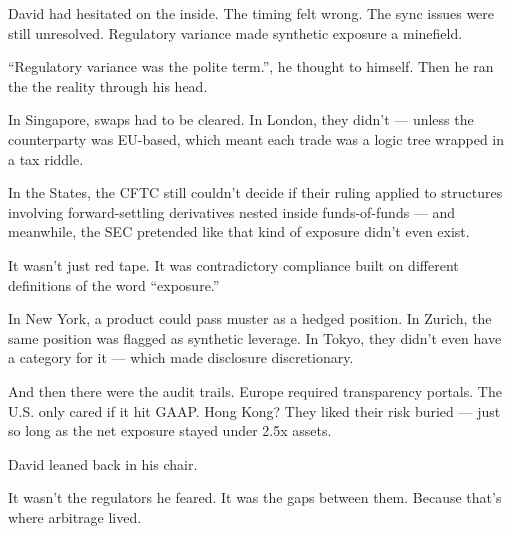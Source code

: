 David had hesitated on the inside.
The timing felt wrong. The sync issues were still unresolved. Regulatory variance made synthetic exposure 
a minefield.

``Regulatory variance was the polite term.'', he thought to himself. Then he ran the
the reality through his head.

\medskip

\begin{tcolorbox}[
    enhanced,
    sharp corners,
    boxrule=0pt,
    colback=gray!3,
    borderline west={2pt}{0pt}{gray!60}, %
    left=10pt,
    right=10pt,
    top=6pt,
    bottom=6pt,
    width=\linewidth,
    fontupper=\small\itshape
  ]
  In Singapore, swaps had to be cleared.  
  In London, they didn’t — unless the counterparty was EU-based, which meant each trade was a logic tree wrapped in a tax riddle.

  \medskip
  
  In the States, the CFTC still couldn’t decide if their ruling applied to structures involving forward-settling derivatives nested inside funds-of-funds —  
  and meanwhile, the SEC pretended like that kind of exposure didn’t even exist.

  \medskip
  
  
  It wasn’t just red tape.  
  It was contradictory compliance built on different definitions of the word “exposure.”

  \medskip
  
  
  In New York, a product could pass muster as a hedged position.  
  In Zurich, the same position was flagged as synthetic leverage.  
  In Tokyo, they didn’t even have a category for it — which made disclosure discretionary.

  \medskip
  
  And then there were the audit trails.  
  Europe required transparency portals.  
  The U.S. only cared if it hit GAAP.  
  Hong Kong? They liked their risk buried — just so long as the net exposure stayed under 2.5x assets.
\end{tcolorbox}
  
\medskip

David leaned back in his chair.

It wasn’t the regulators he feared.
It was the gaps between them.
Because that’s where arbitrage lived.

\medskip

